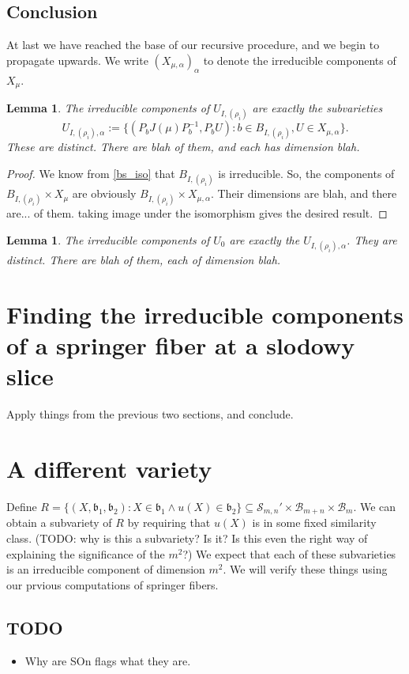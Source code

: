 \documentclass[12pt,psamsfonts]{article}
\newtheorem{lemma}[theorem]{Lemma}
\begin{document}
\subsection{Conclusion}
At last we have reached the base of our recursive procedure, and we begin to propagate upwards.
We write \((X_{\mu, \alpha})_\alpha\) to denote the irreducible components of \(X_\mu\).
\begin{lemma}
    The irreducible components of \(U_{I, (\rho_i)}\) are exactly the subvarieties 
    \[U_{I, (\rho_i), \alpha} := \{(P_b J(\mu) P_b^{-1}, P_b U) : b \in B_{I, (\rho_i)}, U \in X_{\mu, \alpha}\}.\]
    These are distinct.  
    There are blah of them, and each has dimension blah.
\end{lemma}
\begin{proof}
    We know from \cref{bs_iso} that \(B_{I, (\rho_i)}\) is irreducible.
    So, the components of \(B_{I, (\rho_i)} \times X_\mu\) are obviously \(B_{I, (\rho_i)} \times X_{\mu, \alpha}\).
    Their dimensions are blah, and there are... of them.
    taking image under the isomorphism gives the desired result.
\end{proof}

\begin{lemma}
    The irreducible components of \(U_0\) are exactly the \(U_{I, (\rho_i), \alpha}\).
    They are distinct.
    There are blah of them, each of dimension blah.
\end{lemma}

\section{Finding the irreducible components of a springer fiber at a slodowy slice}
Apply things from the previous two sections, and conclude.

\section{A different variety}
Define \(R = \{(X, \mathfrak{b}_1, \mathfrak{b}_2) : X \in \mathfrak{b}_1 \land u(X) \in \mathfrak{b}_2\} \subseteq \mathcal{S}_{m,n}' \times \mathcal{B}_{m + n} \times \mathcal{B}_m\).
We can obtain a subvariety of \(R\) by requiring that \(u(X)\) is in some fixed similarity class.
(TODO: why is this a subvariety?  Is it?  Is this even the right way of explaining the significance of the \(m^2\)?)
We expect that each of these subvarieties is an irreducible component of dimension \(m^2\).
We will verify these things using our prvious computations of springer fibers.

\subsection{TODO}
\begin{itemize}
    \item Why are SOn flags what they are.
\end{itemize}


\end{document}

